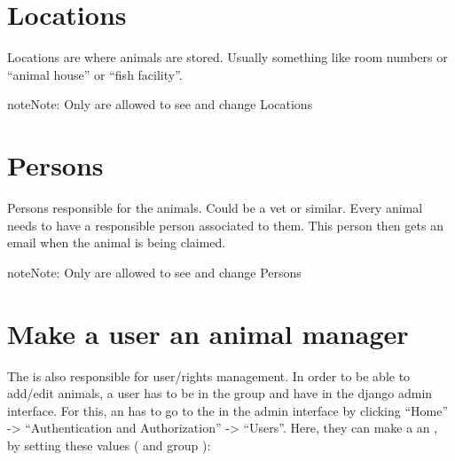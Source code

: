\documentclass[letterpaper,10pt,openany,oneside,english]{sphinxmanual}
\begin{document}
\section{Locations}
\label{\detokenize{index:locations}}
Locations are where animals are stored. Usually something like room numbers or “animal house” or “fish facility”.

\noindent{}

\begin{sphinxadmonition}{note}{Note:}
Only  are allowed to see and change Locations
\end{sphinxadmonition}


\section{Persons}
\label{\detokenize{index:persons}}
Persons responsible for the animals. Could be a vet or similar.
Every animal needs to have a responsible person associated to them. This person then gets
an email when the animal is being claimed.

\noindent{}

\begin{sphinxadmonition}{note}{Note:}
Only  are allowed to see and change Persons
\end{sphinxadmonition}


\section{Make a user an animal manager}
\label{\detokenize{index:make-a-user-an-animal-manager}}
The  is also responsible for user/rights management.
In order to be able to add/edit animals, a user has to be in the group  and have
 in the django admin interface. For this, an  has to go to the  in the admin interface by clicking “Home” -\textgreater{} “Authentication and
Authorization” -\textgreater{} “Users”. Here, they can make a  an , by setting these values (
and group ):
\end{document}
